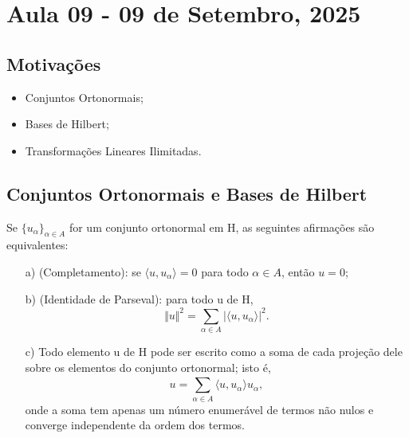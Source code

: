 \documentclass[../functional_analysis.tex]{subfiles}
\begin{document}
\section{Aula 09 - 09 de Setembro, 2025}
\subsection{Motivações}
\begin{itemize}
	\item Conjuntos Ortonormais;
	\item Bases de Hilbert;
	\item Transformações Lineares Ilimitadas.
\end{itemize}
\subsection{Conjuntos Ortonormais e Bases de Hilbert}
\begin{theorem*}
	Se \(\{u_{\alpha }\}_{\alpha \in A}\) for um conjunto ortonormal em H, as seguintes afirmações são equivalentes:
	\begin{itemize}
		\item[a)] (Completamento): se \(\langle u, u_{\alpha } \rangle=0\) para todo \(\alpha \in A\), então \(u=0\);
		\item[b)] \hypertarget{parseval_identity}{(Identidade de Parseval):} para todo u de H,
		      \[
			      \Vert u \Vert^{2}=\sum\limits_{\alpha \in A}^{}| \langle u, u_{\alpha } \rangle |^{2}.
		      \]
		\item[c)] Todo elemento u de H pode ser escrito como a soma de cada projeção dele sobre os elementos do conjunto ortonormal; isto é,
		      \[
			      u=\sum\limits_{\alpha \in A}^{} \langle u, u_{\alpha } \rangle u_{\alpha },
		      \]
		      onde a soma tem apenas um número enumerável de termos não nulos e converge independente da ordem dos termos.
	\end{itemize}
\end{theorem*}
\end{document}
